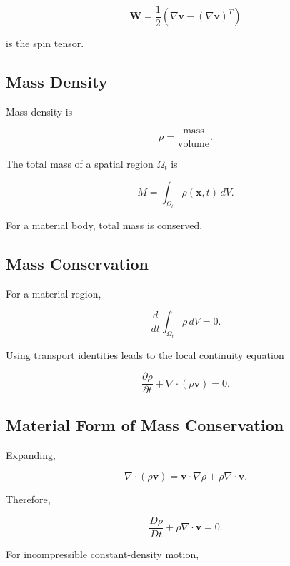 \[
\boxed{
\mathbf{W}
=
\frac12
\left(
\nabla\mathbf{v}
-
(\nabla\mathbf{v})^T
\right)
}
\]

is the spin tensor.

\subsection{Mass Density}
\label{subsec:continuum-density}

Mass density is

\[
\boxed{
\rho
=
\frac{\text{mass}}
{\text{volume}}.
}
\]

The total mass of a spatial region \(\Omega_t\) is

\[
\boxed{
M
=
\int_{\Omega_t}
\rho(\mathbf{x},t)\,dV.
}
\]

For a material body, total mass is conserved.

\subsection{Mass Conservation}
\label{subsec:continuum-mass-conservation}

For a material region,

\[
\boxed{
\frac{d}{dt}
\int_{\Omega_t}
\rho\,dV
=
0.
}
\]

Using transport identities leads to the local continuity equation

\[
\boxed{
\frac{\partial\rho}{\partial t}
+
\nabla\cdot(\rho\mathbf{v})
=
0.
}
\]

\subsection{Material Form of Mass Conservation}
\label{subsec:material-mass-conservation}

Expanding,

\[
\nabla\cdot(\rho\mathbf{v})
=
\mathbf{v}\cdot\nabla\rho
+
\rho\nabla\cdot\mathbf{v}.
\]

Therefore,

\[
\boxed{
\frac{D\rho}{Dt}
+
\rho\nabla\cdot\mathbf{v}
=
0.
}
\]

For incompressible constant-density motion,

